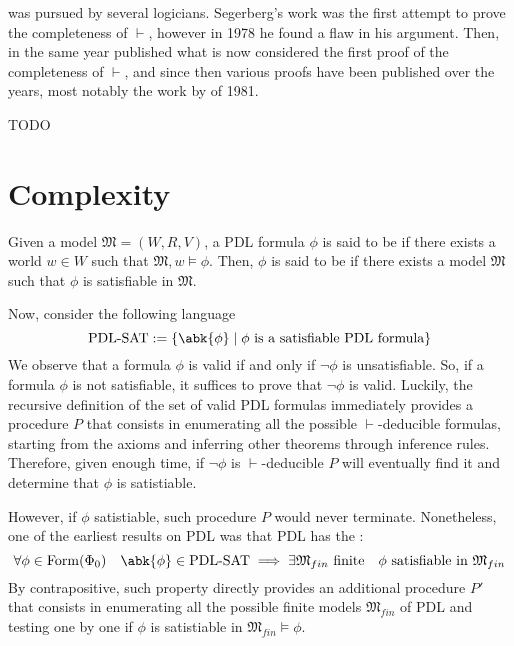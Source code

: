 \documentclass[a4paper, 12pt]{report}
\begin{document}
     was pursued by several logicians. Segerberg's work was the first attempt to prove the completeness of $\vdash$, however in 1978 he found a flaw in his argument. Then, in the same year \textcite{parikh} published what is now considered the first proof of the completeness of $\vdash$, and since then various proofs have been published over the years, most notably the work by \textcite{kozen} of 1981. 

    TODO 

    \section{Complexity}

    Given a model $\mathfrak M = (W, R, V)$, a PDL formula $\phi$ is said to be  if there exists a world $w \in W$ such that $\mathfrak M, w \models \phi$. Then, $\phi$ is said to be  if there exists a model $\mathfrak M$ such that $\phi$ is satisfiable in $\mathfrak M$.
    
    Now, consider the following language $$\mbox{PDL-SAT} := \{\abk{\phi} \mid \phi \ \mbox{is a satisfiable PDL formula}\}$$ We observe that a formula $\phi$ is valid if and only if $\lnot \phi$ is unsatisfiable. So, if a formula $\phi$ is not satisfiable, it suffices to prove that $\lnot \phi$ is valid. Luckily, the recursive definition of the set of valid PDL formulas immediately provides a procedure $P$ that consists in enumerating all the possible $\vdash$-deducible formulas, starting from the axioms and inferring other theorems through inference rules. Therefore, given enough time, if $\lnot \phi$ is $\vdash$-deducible $P$ will eventually find it and determine that $\phi$ is  satistiable.

    However, if $\phi$  satistiable, such procedure $P$ would never terminate. Nonetheless, one of the earliest results on PDL was that PDL has the : $$\forall \phi \in \mathrm{Form}(\Phi_0) \quad \abk{\phi} \in \mbox{PDL-SAT} \implies \exists \mathfrak M_{fin} \ \mbox{finite} \quad \phi \ \mbox{satisfiable in} \ \mathfrak M_{fin}$$ By contrapositive, such property directly provides an additional procedure $P'$ that consists in enumerating all the possible finite models $\mathfrak M_{fin}$ of PDL and testing one by one if $\phi$ is satistiable in $\mathfrak M_{fin} \models \phi$.
\end{document}
